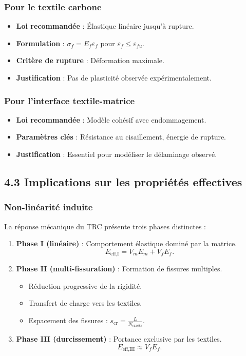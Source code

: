 \documentclass{rapportECL}
\begin{document}
\subsubsection*{Pour le textile carbone}
\begin{itemize}
    \item \textbf{Loi recommandée} : Élastique linéaire jusqu'à rupture.
    \item \textbf{Formulation} : $\sigma_f = E_f\varepsilon_f$ pour $\varepsilon_f \leq \varepsilon_{fu}$.
    \item \textbf{Critère de rupture} : Déformation maximale.
    \item \textbf{Justification} : Pas de plasticité observée expérimentalement.
\end{itemize}

\subsubsection*{Pour l'interface textile-matrice}
\begin{itemize}
    \item \textbf{Loi recommandée} : Modèle cohésif avec endommagement.
    \item \textbf{Paramètres clés} : Résistance au cisaillement, énergie de rupture.
    \item \textbf{Justification} : Essentiel pour modéliser le délaminage observé.
\end{itemize}

\subsection*{4.3 Implications sur les propriétés effectives}
\subsubsection*{Non-linéarité induite}
La réponse mécanique du TRC présente trois phases distinctes :
\begin{enumerate}
    \item \textbf{Phase I (linéaire)} : Comportement élastique dominé par la matrice.
    \[
    E_{\text{eff,I}} = V_m E_m + V_f E_f.
    \]
    \item \textbf{Phase II (multi-fissuration)} : Formation de fissures multiples.
    \begin{itemize}
        \item Réduction progressive de la rigidité.
        \item Transfert de charge vers les textiles.
        \item Espacement des fissures : $s_{\text{cr}} = \frac{L}{N_{\text{cracks}}}$.
    \end{itemize}
    \item \textbf{Phase III (durcissement)} : Portance exclusive par les textiles.
    \[
    E_{\text{eff,III}} \approx V_f E_f.
    \]
\end{enumerate}
\end{document}
